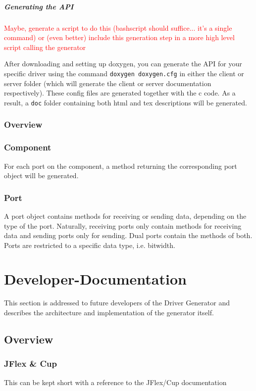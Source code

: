 \documentclass{report}
\begin{document}
\paragraph{Generating the API}
\textcolor{red}{Maybe, generate a script to do this (bashscript should suffice... it's a single command) or (even better) include this generation step in a more high level script calling the generator}

After downloading and setting up doxygen, you can generate the API for your specific driver using the command \texttt{doxygen doxygen.cfg} in either the client or server folder (which will generate the client or server documentation respectively). These config files are generated together with the c code.
As a result, a \texttt{doc} folder containing both html and tex descriptions will be generated.

\subsection{Overview}

\subsection{Component}
For each port on the component, a method returning the corresponding port object will be generated.

\subsection{Port}
A port object contains methods for receiving or sending data, depending on the type of the port. Naturally, receiving ports only contain methods for receiving data and sending ports only for sending. Dual ports contain the methods of both. Ports are restricted to a specific data type, i.e. bitwidth.

\chapter{Developer-Documentation}
\label{sec:devDoc}
This section is addressed to future developers of the Driver Generator and describes the architecture and implementation of the generator itself.

\section{Overview}

\subsection{JFlex \& Cup}
This can be kept short with a reference to the JFlex/Cup documentation
\end{document}
